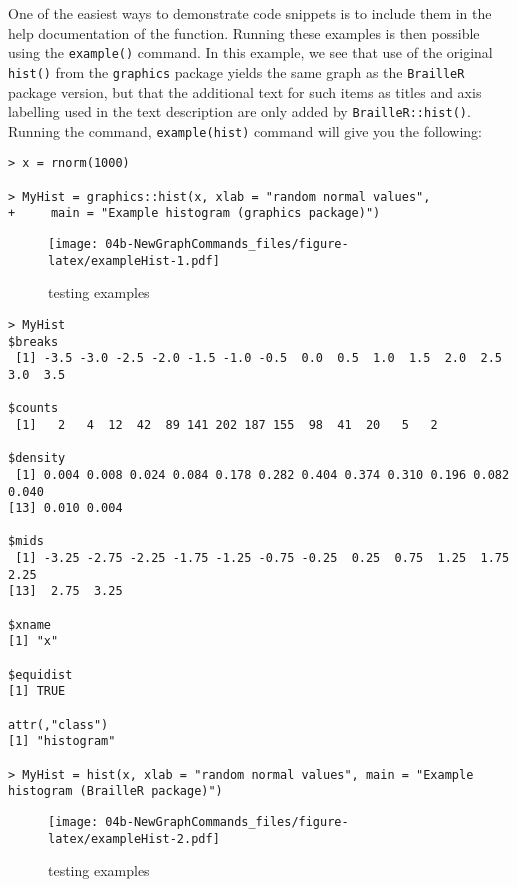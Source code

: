 \documentclass[
]{book}
\begin{document}
One of the easiest ways to demonstrate code snippets is to include them in the help documentation of the function. Running these examples is then possible using the \texttt{example()} command.
In this example, we see that use of the original \texttt{hist()} from the \texttt{graphics} package yields the same graph as the \texttt{BrailleR} package version, but that the additional text for such items as titles and axis labelling used in the text description are only added by \texttt{BrailleR::hist()}. Running the command, \texttt{example(hist)} command will give you the following:

\begin{verbatim}
> x = rnorm(1000)

> MyHist = graphics::hist(x, xlab = "random normal values", 
+     main = "Example histogram (graphics package)")
\end{verbatim}

\begin{figure}
\centering
\texttt{[image: 04b-NewGraphCommands\_files/figure-latex/exampleHist-1.pdf]}
\caption{\label{fig:exampleHist-1}testing examples}
\end{figure}

\begin{verbatim}
> MyHist
$breaks
 [1] -3.5 -3.0 -2.5 -2.0 -1.5 -1.0 -0.5  0.0  0.5  1.0  1.5  2.0  2.5  3.0  3.5

$counts
 [1]   2   4  12  42  89 141 202 187 155  98  41  20   5   2

$density
 [1] 0.004 0.008 0.024 0.084 0.178 0.282 0.404 0.374 0.310 0.196 0.082 0.040
[13] 0.010 0.004

$mids
 [1] -3.25 -2.75 -2.25 -1.75 -1.25 -0.75 -0.25  0.25  0.75  1.25  1.75  2.25
[13]  2.75  3.25

$xname
[1] "x"

$equidist
[1] TRUE

attr(,"class")
[1] "histogram"

> MyHist = hist(x, xlab = "random normal values", main = "Example histogram (BrailleR package)")
\end{verbatim}

\begin{figure}
\centering
\texttt{[image: 04b-NewGraphCommands\_files/figure-latex/exampleHist-2.pdf]}
\caption{\label{fig:exampleHist-2}testing examples}
\end{figure}
\end{document}
